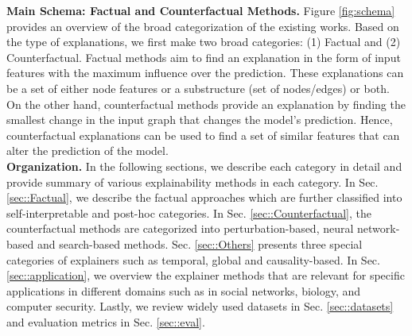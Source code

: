 \noindent
\textbf{Main Schema: Factual and Counterfactual Methods. } Figure \ref{fig:schema} provides an overview of the broad categorization of the existing works. Based on the type of explanations, we first make two broad categories: (1) Factual and (2) Counterfactual. Factual methods aim to
find an explanation in the form of input features with the maximum influence over the prediction. These explanations can be a set of either node features or a substructure (set of nodes/edges) or both. On the other hand, counterfactual methods provide an explanation by finding the smallest change in the input graph that changes the model's prediction. Hence, counterfactual explanations can be used to find a set of similar features that can alter the prediction of the model.\\
\noindent
\textbf{Organization. }In the following sections, we describe each category in detail and provide summary of various explainability methods in each category. In Sec. \ref{sec::Factual}, we describe the factual approaches which are further classified into self-interpretable and post-hoc categories. In Sec. \ref{sec::Counterfactual}, the counterfactual methods are categorized into perturbation-based, neural network-based and search-based methods. Sec. \ref{sec::Others} presents three special categories of explainers such as temporal, global and causality-based. In Sec. \ref{sec::application}, we overview the explainer methods that are relevant for specific applications in different domains such as in social networks, biology, and computer security. Lastly, we review widely used datasets in Sec. \ref{sec::datasets} and evaluation metrics in Sec. \ref{sec::eval}.









